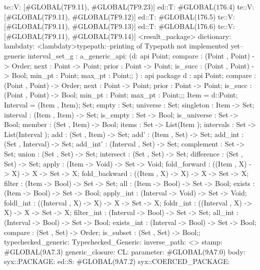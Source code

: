                      te::V:
                     [#GLOBAL(7F9.11), #GLOBAL(7F9.23)]
                    ed::T: #GLOBAL(176.4)
                     te::V:
                     [#GLOBAL(7F9.11), #GLOBAL(7F9.12)]
                    ed::T: #GLOBAL(176.5)
                     te::V:
                     [#GLOBAL(7F9.11), #GLOBAL(7F9.13)]
                    ed::T: #GLOBAL(176.6)
                     te::V:
                     [#GLOBAL(7F9.11), #GLOBAL(7F9.14)]
         <result_package>
dictionary:
lambdaty:
  <lambdaty>typepath:--printing of Typepath not implemented yet--
generic interval_set_g
:
a_generic_api:
(d:
api {
    Point;
    compare : (Point , Point) -> Order;
    next : Point -> Point;
    prior : Point -> Point;
    is_succ : (Point , Point) -> Bool;
    min_pt : Point;
    max_pt : Point;};
)
:
api {   package d
          : api {
                Point;
                compare : (Point , Point) -> Order;
                next : Point -> Point;
                prior : Point -> Point;
                is_succ : (Point , Point) -> Bool;
                min_pt : Point;
                max_pt : Point;};;
    Item  = d::Point;
    Interval  = (Item , Item);
    Set;
    empty : Set;
    universe : Set;
    singleton : Item -> Set;
    interval : (Item , Item) -> Set;
    is_empty : Set -> Bool;
    is_universe : Set -> Bool;
    member : (Set , Item) -> Bool;
    items : Set -> List(Item );
    intervals : Set -> List(Interval );
    add : (Set , Item) -> Set;
    add' : (Item , Set) -> Set;
    add_int : (Set , Interval) -> Set;
    add_int' : (Interval , Set) -> Set;
    complement : Set -> Set;
    union : (Set , Set) -> Set;
    intersect : (Set , Set) -> Set;
    difference : (Set , Set) -> Set;
    apply : (Item -> Void) -> Set -> Void;
    fold_forward : ((Item , X) -> X) -> X -> Set -> X;
    fold_backward : ((Item , X) -> X) -> X -> Set -> X;
    filter : (Item -> Bool) -> Set -> Set;
    all : (Item -> Bool) -> Set -> Bool;
    exists : (Item -> Bool) -> Set -> Bool;
    apply_int : (Interval -> Void) -> Set -> Void;
    foldl_int : ((Interval , X) -> X) -> X -> Set -> X;
    foldr_int : ((Interval , X) -> X) -> X -> Set -> X;
    filter_int : (Interval -> Bool) -> Set -> Set;
    all_int : (Interval -> Bool) -> Set -> Bool;
    exists_int : (Interval -> Bool) -> Set -> Bool;
    compare : (Set , Set) -> Order;
    is_subset : (Set , Set) -> Bool;};
typechecked_generic:
Typechecked_Generic:
inverse_path: <>
stamp: #GLOBAL(9A7.3)
generic_closure:
CL:
parameter: #GLOBAL(9A7.0)
body: syx::PACKAGE:
        ed::S: #GLOBAL(9A7.2)
            syx::COERCED_PACKAGE:
